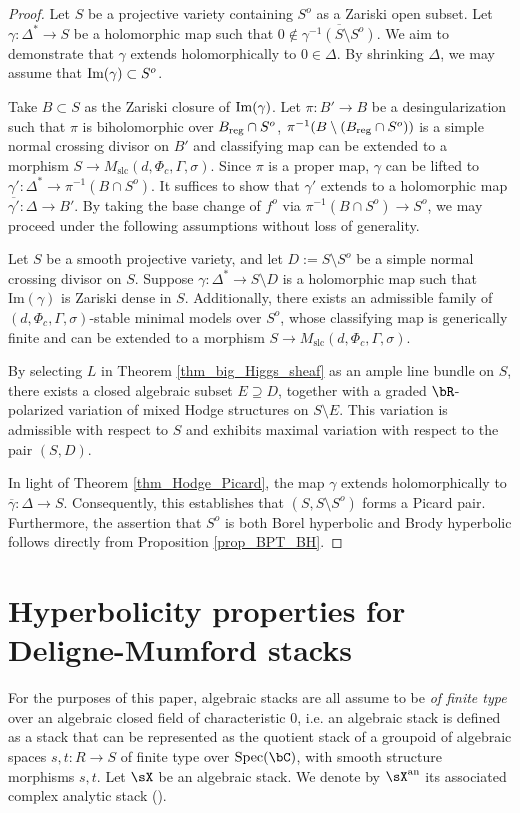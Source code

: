 \documentclass[11pt,letterpaper]{amsart}
\numberwithin{equation}{section}
\begin{document}
	\begin{proof}
		Let $S$ be a projective variety containing $S^o$ as a Zariski open subset. 
		Let $\gamma: \Delta^\ast \to S$ be a holomorphic map such that $0 \notin \overline{\gamma^{-1}(S \setminus S^o)}$. We aim to demonstrate that $\gamma$ extends holomorphically to $0 \in \Delta$. By shrinking $\Delta$, we may assume that ${\rm Im}(\gamma) \subset S^o$.  
		
		Take $B \subset S$ as the Zariski closure of ${\rm Im}(\gamma)$. Let $\pi: B' \to B$ be a desingularization such that $\pi$ is biholomorphic over $B_{\rm reg} \cap S^o$, $\pi^{-1}(B \setminus (B_{\rm reg} \cap S^o))$ is a simple normal crossing divisor on $B'$ and classifying map can be extended to a morphism $S \to M_{\text{slc}}(d, \Phi_c, \Gamma, \sigma)$. Since $\pi$ is a proper map, $\gamma$ can be lifted to $\gamma': \Delta^\ast \to \pi^{-1}(B \cap S^o)$. It suffices to show that $\gamma'$ extends to a holomorphic map $\overline{\gamma'}: \Delta \to B'$. By taking the base change of $f^o$ via $\pi^{-1}(B \cap S^o) \to S^o$, we may proceed under the following assumptions without loss of generality.
		\begin{framed}
			Let $S$ be a smooth projective variety, and let $D := S \setminus S^o$ be a simple normal crossing divisor on $S$. Suppose $\gamma: \Delta^\ast \to S \setminus D$ is a holomorphic map such that $\text{Im}(\gamma)$ is Zariski dense in $S$. Additionally, there exists an admissible family of $(d, \Phi_c, \Gamma, \sigma)$-stable minimal models over $S^o$, whose classifying map is generically finite and can be extended to a morphism $S \to M_{\text{slc}}(d, \Phi_c, \Gamma, \sigma)$.
		\end{framed}
		By selecting $L$ in Theorem \ref{thm_big_Higgs_sheaf} as an ample line bundle on $S$, there exists a closed algebraic subset $E \supseteq D$, together with a graded $\bR$-polarized variation of mixed Hodge structures on $S \setminus E$. This variation is admissible with respect to $S$ and exhibits maximal variation with respect to the pair $(S, D)$.  
		
		In light of Theorem \ref{thm_Hodge_Picard}, the map $\gamma$ extends holomorphically to $\overline{\gamma}: \Delta \to S$. Consequently, this establishes that $(S, S \setminus S^o)$ forms a Picard pair. Furthermore, the assertion that $S^o$ is both Borel hyperbolic and Brody hyperbolic follows directly from Proposition \ref{prop_BPT_BH}.
	\end{proof}
    \section{Hyperbolicity properties for Deligne-Mumford stacks}
    For the purposes of this paper, algebraic stacks are all assume to be \emph{of finite type} over an algebraic closed field of characteristic 0, i.e. an algebraic stack is defined as a stack that can be represented as the quotient stack of a groupoid of algebraic spaces $s,t: R \to S$ of finite type over ${\rm Spec}(\bC)$, with smooth structure morphisms $s,t$.      
    Let $\sX$ be an algebraic stack. We denote by $\sX^{\rm an}$ its associated complex analytic stack (\cite{Noohi2005,Behrend2006}).
\end{document}
